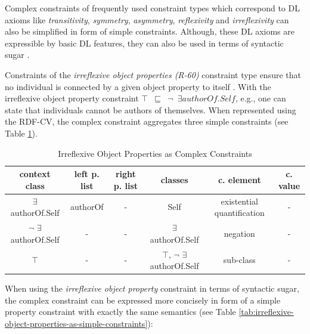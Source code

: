 \documentclass[a4paper,fontsize=11pt]{scrartcl}
\newcommand{\ms}[1]{\texttt{#1}}
\begin{document}
Complex constraints of frequently used constraint types which correspond to DL axioms like \emph{transitivity}, \emph{symmetry}, \emph{asymmetry}, \emph{reflexivity} and \emph{irreflexivity} can also be simplified in form of simple constraints. Although, these DL axioms are expressible by basic DL features, they can also be used in terms of syntactic sugar \cite{BoschEckert2015-2}.

Constraints of the \emph{irreflexive object properties (R-60)} constraint type ensure that no individual is connected by a given object property to itself \cite{Kroetzsch2012}. With the irreflexive object property constraint {\small\ms{$\top$ $\sqsubseteq$ $\neg$ $\exists authorOf.Self$}}, e.g., one can state that individuals cannot be authors of themselves. When represented using the RDF-CV, the complex constraint aggregates three simple constraints (see Table \ref{tab:irreflexive-object-properties-as-complex-constraints}).


\begin{table}[H]
  \scriptsize
  \sffamily
  \vspace{0cm}
	\caption{Irreflexive Object Properties as Complex Constraints}
	\label{tab:irreflexive-object-properties-as-complex-constraints}
	\centering
		\begin{tabular}{c|c|c|c|c|c}
      \textbf{context class} & \textbf{left p. list} & \textbf{right p. list} & \textbf{classes} & \textbf{c. element} & \textbf{c. value} \\
      \hline
$\exists$ authorOf.Self & authorOf & - & Self & existential quantification & - \\
$\neg$ $\exists$ authorOf.Self & - & - & $\exists$ authorOf.Self & negation & - \\
$\top$ & - & - & $\top$, $\neg$ $\exists$ authorOf.Self & sub-class & - \\
		\end{tabular}
\end{table}

When using the \emph{irreflexive object property} constraint in terms of syntactic sugar, 
the complex constraint can be expressed more concisely in form of a simple property constraint with exactly the same semantics (see Table \ref{tab:irreflexive-object-properties-as-simple-constraints}):
\end{document}
